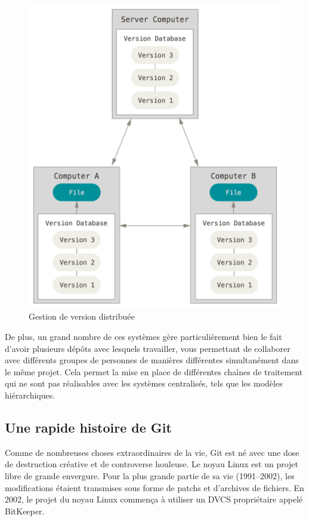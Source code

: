 \begin{figure}[!h]
  \centering
  \includegraphics{images/distributed}
  \caption{Gestion de version distribuée}
  \label{fig:git:distributed}
\end{figure}

De plus, un grand nombre de ces systèmes gère particulièrement bien le fait d'avoir plusieurs dépôts avec lesquels travailler, vous permettant de collaborer avec différents groupes de personnes de manières différentes simultanément dans le même projet.
Cela permet la mise en place de différentes chaînes de traitement qui ne sont pas réalisables avec les systèmes centralisés, tels que les modèles hiérarchiques.

\subsection{Une rapide histoire de Git}

Comme de nombreuses choses extraordinaires de la vie, Git est né avec une dose de destruction créative et de controverse houleuse.
Le noyau Linux est un projet libre de grande envergure.
Pour la plus grande partie de sa vie (1991–2002), les modifications étaient transmises sous forme de patchs et d'archives de fichiers.
En 2002, le projet du noyau Linux commença à utiliser un DVCS propriétaire appelé BitKeeper.

